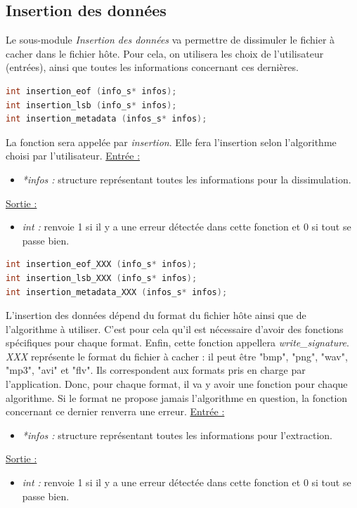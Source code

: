 \documentclass[11pt]{article}
\begin{document}
\subsection{Insertion des données}

Le sous-module \textit{Insertion des données} va permettre de dissimuler 
le fichier à cacher dans le fichier hôte. Pour cela, on utilisera les choix 
de l'utilisateur (entrées), ainsi que toutes les informations concernant 
ces dernières. 

\begin{lstlisting}[language=c]
int insertion_eof (info_s* infos); 
int insertion_lsb (info_s* infos);
int insertion_metadata (infos_s* infos);
\end{lstlisting}

La fonction sera appelée par \textit{insertion}.
Elle fera l'insertion selon l'algorithme choisi par l'utilisateur. 
\newline
\underline{Entrée :} 
\begin{itemize}
\item \textit{*infos :} structure représentant toutes les informations pour 
la dissimulation.  
\end{itemize}
\underline{Sortie :} 
\begin{itemize}
\item \textit{int :} renvoie 1 si il y a une erreur détectée dans cette 
fonction et 0 si tout se passe bien.  
\newline 
\end{itemize}

\begin{lstlisting}[language=c]
int insertion_eof_XXX (info_s* infos); 
int insertion_lsb_XXX (info_s* infos);
int insertion_metadata_XXX (infos_s* infos);
\end{lstlisting}

L'insertion des données dépend du format du fichier hôte ainsi que de 
l'algorithme à utiliser. C'est pour cela qu'il est nécessaire d'avoir 
des fonctions spécifiques pour chaque format. 
Enfin, cette fonction appellera \textit{write\_signature}.
\textit{XXX} représente le format du fichier à cacher : il peut être 
"bmp", "png", "wav", "mp3", "avi" et "flv". Ils correspondent aux formats 
pris en charge par l'application. Donc, pour chaque format, il va y avoir 
une fonction pour chaque algorithme. Si le format ne propose jamais l'algorithme 
en question, la fonction concernant ce dernier renverra une erreur. 
\newline
\underline{Entrée :} 
\begin{itemize}
\item \textit{*infos :} structure représentant toutes les informations pour 
l'extraction. 
\end{itemize}
\underline{Sortie :} 
\begin{itemize}
\item \textit{int :} renvoie 1 si il y a une erreur détectée dans cette 
fonction et 0 si tout se passe bien.  
\newline 
\end{itemize}
\end{document}
